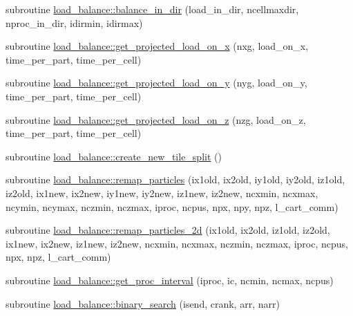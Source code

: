 \begin{DoxyCompactItemize}
\item 
subroutine \hyperlink{namespaceload__balance_ad4c6fb0e9afcfb791d37effad4fce7b0}{load\+\_\+balance\+::balance\+\_\+in\+\_\+dir} (load\+\_\+in\+\_\+dir, ncellmaxdir, nproc\+\_\+in\+\_\+dir, idirmin, idirmax)
\item 
subroutine \hyperlink{namespaceload__balance_aa6300dc3f17e242019b61dd4a5b24837}{load\+\_\+balance\+::get\+\_\+projected\+\_\+load\+\_\+on\+\_\+x} (nxg, load\+\_\+on\+\_\+x, time\+\_\+per\+\_\+part, time\+\_\+per\+\_\+cell)
\item 
subroutine \hyperlink{namespaceload__balance_ab142c37dc5124945701b728ff7447959}{load\+\_\+balance\+::get\+\_\+projected\+\_\+load\+\_\+on\+\_\+y} (nyg, load\+\_\+on\+\_\+y, time\+\_\+per\+\_\+part, time\+\_\+per\+\_\+cell)
\item 
subroutine \hyperlink{namespaceload__balance_a7808443cfc827402ff6fdc18042a7325}{load\+\_\+balance\+::get\+\_\+projected\+\_\+load\+\_\+on\+\_\+z} (nzg, load\+\_\+on\+\_\+z, time\+\_\+per\+\_\+part, time\+\_\+per\+\_\+cell)
\item 
subroutine \hyperlink{namespaceload__balance_a1b48248474342795414464922bd12126}{load\+\_\+balance\+::create\+\_\+new\+\_\+tile\+\_\+split} ()
\item 
subroutine \hyperlink{namespaceload__balance_a763d93918d09c31698f45ba8eb6d0112}{load\+\_\+balance\+::remap\+\_\+particles} (ix1old, ix2old, iy1old, iy2old, iz1old, iz2old,                                                                                                                       ix1new, ix2new, iy1new, iy2new, iz1new, iz2new,                                                                                                                       ncxmin, ncxmax, ncymin, ncymax, nczmin, nczmax,                                                                                                                       iproc, ncpus, npx, npy, npz, l\+\_\+cart\+\_\+comm)
\item 
subroutine \hyperlink{namespaceload__balance_a6c1308b9aa42cf5737f4e2b86f0f14c7}{load\+\_\+balance\+::remap\+\_\+particles\+\_\+2d} (ix1old, ix2old, iz1old, iz2old,                                                                                                                       ix1new, ix2new, iz1new, iz2new,                                                                                                                       ncxmin, ncxmax, nczmin, nczmax,                                                                                                                       iproc, ncpus, npx, npz, l\+\_\+cart\+\_\+comm)
\item 
subroutine \hyperlink{namespaceload__balance_a087dd46e7ee1525b5d13fd38e60ec939}{load\+\_\+balance\+::get\+\_\+proc\+\_\+interval} (iproc, ic, ncmin, ncmax, ncpus)
\item 
subroutine \hyperlink{namespaceload__balance_ac4f4010ec67a5d146b5c288511b4f98a}{load\+\_\+balance\+::binary\+\_\+search} (isend, crank, arr, narr)
\end{DoxyCompactItemize}
